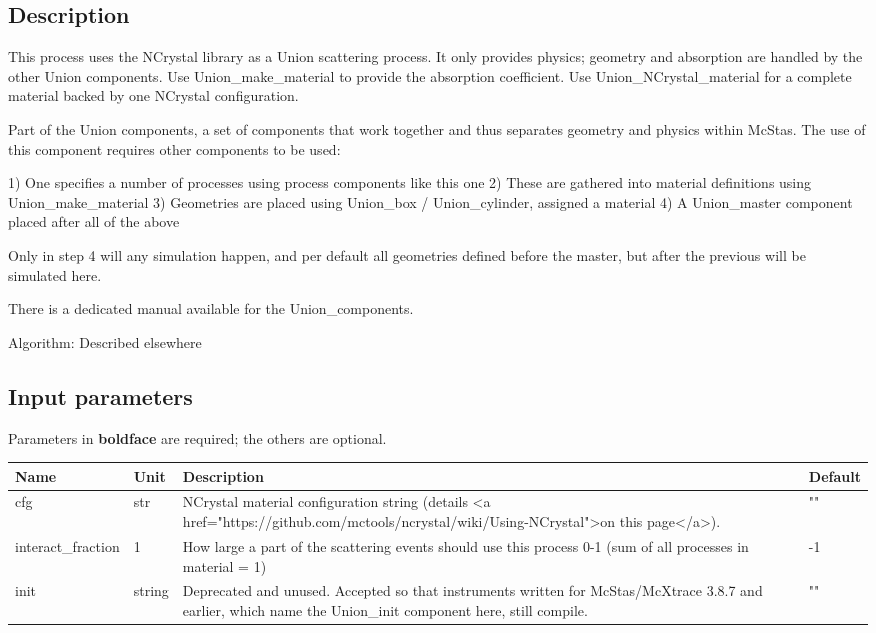 \subsection*{Description}
This process uses the NCrystal library as a Union scattering process. It only provides physics; geometry and absorption are handled by the other Union components. Use Union\_make\_material to provide the absorption coefficient. Use Union\_NCrystal\_material for a complete material backed by one NCrystal configuration.

Part of the Union components, a set of components that work together and thus separates geometry and physics within McStas. The use of this component requires other components to be used:

1) One specifies a number of processes using process components like this one 2) These are gathered into material definitions using Union\_make\_material 3) Geometries are placed using Union\_box / Union\_cylinder, assigned a material 4) A Union\_master component placed after all of the above

Only in step 4 will any simulation happen, and per default all geometries defined before the master, but after the previous will be simulated here.

There is a dedicated manual available for the Union\_components.

Algorithm: Described elsewhere

\subsection*{Input parameters}
Parameters in \textbf{boldface} are required; the others are optional.

\begin{longtable}{p{}p{}p{}p{}}
\toprule
\textbf{Name} & \textbf{Unit} & \textbf{Description} & \textbf{Default} \\
\midrule
\endhead
cfg & str & NCrystal material configuration string (details \textless{}a href="https://github.com/mctools/ncrystal/wiki/Using-NCrystal"\textgreater{}on this page\textless{}/a\textgreater{}). & "" \\
interact\_fraction & 1 & How large a part of the scattering events should use this process 0-1 (sum of all processes in material = 1) & -1 \\
init & string & Deprecated and unused. Accepted so that instruments written for McStas/McXtrace 3.8.7 and earlier, which name the Union\_init component here, still compile. & "" \\
\bottomrule
\end{longtable}


